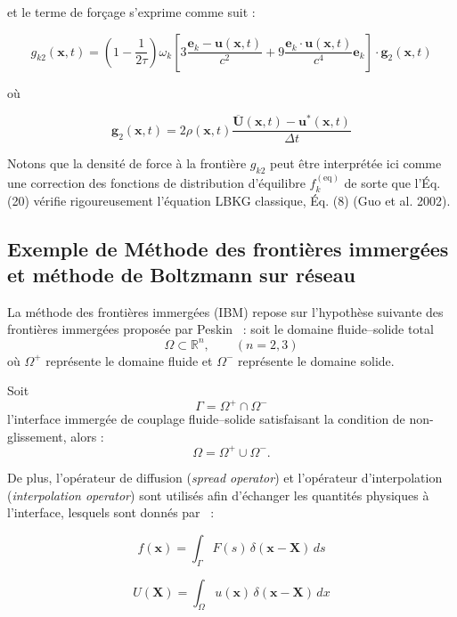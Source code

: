 \documentclass[12pt,a4paper]{report}
\begin{document}
et le terme de forçage s'exprime comme suit :

\begin{equation}
g_{k2}(\mathbf{x}, t) = \left(1 - \frac{1}{2\tau}\right) \omega_k \left[ 3 \frac{\mathbf{e}_k - \mathbf{u}(\mathbf{x}, t)}{c^2} + 9 \frac{\mathbf{e}_k \cdot \mathbf{u}(\mathbf{x}, t)}{c^4} \mathbf{e}_k \right] \cdot \mathbf{g}_2(\mathbf{x}, t)
\label{eq:gk2}
\end{equation}

où

\begin{equation}
\mathbf{g}_2(\mathbf{x}, t) = 2\rho(\mathbf{x}, t) \frac{\overline{\mathbf{U}}(\mathbf{x}, t) - \mathbf{u}^*(\mathbf{x}, t)}{\Delta t}
\label{eq:g2}
\end{equation}

Notons que la densité de force à la frontière \( g_{k2} \) peut être interprétée ici comme une correction des fonctions de distribution d'équilibre \( f_k^{(\text{eq})} \) de sorte que l'Éq. (20) vérifie rigoureusement l'équation LBKG classique, Éq. (8) (Guo et al. 2002).



\subsection{Exemple de Méthode des frontières immergées et méthode de Boltzmann sur réseau}

La méthode des frontières immergées (IBM) repose sur l’hypothèse suivante des frontières immergées proposée par Peskin~\cite{Peskin} : soit le domaine fluide--solide total
\[
\Omega \subset \mathbb{R}^{n}, \qquad (n=2,3)
\]
où $\Omega^{+}$ représente le domaine fluide et $\Omega^{-}$ représente le domaine solide.

Soit
\[
\Gamma = \Omega^{+} \cap \Omega^{-}
\]
l’interface immergée de couplage fluide--solide satisfaisant la condition de non-glissement, alors :
\[
\Omega = \Omega^{+} \cup \Omega^{-}.
\]

De plus, l’opérateur de diffusion (\textit{spread operator}) et l’opérateur d’interpolation (\textit{interpolation operator}) sont utilisés afin d’échanger les quantités physiques à l’interface, lesquels sont donnés par~\cite{ref33} :

\begin{equation}
f(\mathbf{x})=
\int_{\Gamma}
F(s)\,\delta(\mathbf{x}-\mathbf{X})\,ds
\label{eq1}
\end{equation}

\begin{equation}
U(\mathbf{X})=
\int_{\Omega}
u(\mathbf{x})\,\delta(\mathbf{x}-\mathbf{X})\,dx
\label{eq2}
\end{equation}
\end{document}
